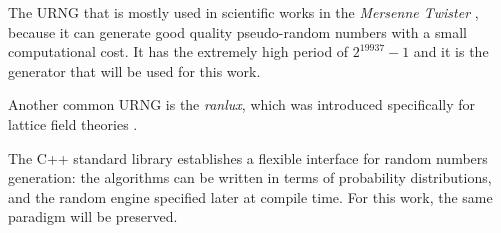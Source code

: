 The URNG that is mostly used in scientific works in the \emph{Mersenne Twister} \cite{mersenne-twister},
because it can generate good quality pseudo-random numbers with a small computational cost.
It has the extremely high period of $2^{19937}-1$ and it is the generator that will be used for this work.

Another common URNG is the \emph{ranlux}, which was introduced specifically for lattice field theories \cite{ranlux}.

The C++ standard library establishes a flexible interface for random numbers generation:
the algorithms can be written in terms of probability distributions,
and the random engine specified later at compile time.
For this work, the same paradigm will be preserved.

%
%

